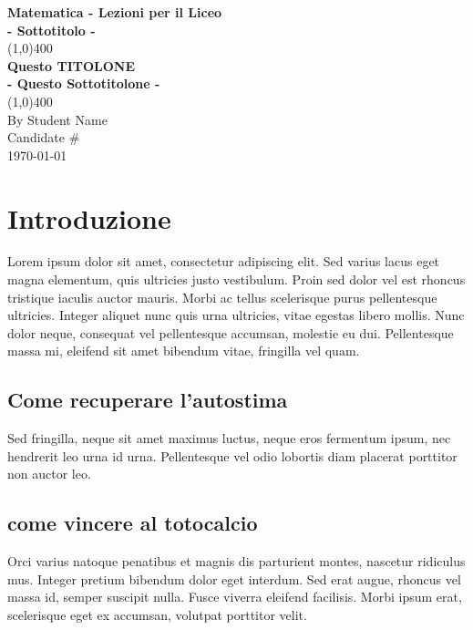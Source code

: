\documentclass[10pt]{article}
\begin{document}
\begin{titlepage}
\begin{center}
\vspace*{1cm}
\Large{\textbf{Matematica - Lezioni per il Liceo}}\\
\large{\textbf{- Sottotitolo -}}\\
\vfill
\line(1,0){400}\\[.5mm]
\huge{\textbf{Questo TITOLONE}}\\[3mm]
\Large{\textbf{- Questo Sottotitolone -}}\\[1mm]
\line(1,0){400}\\
\vfill
{\scriptsize By Student Name}\\
{\scriptsize Candidate \#} \\
{\scriptsize \today} \\

\end{center}
\end{titlepage}

\tableofcontents
\thispagestyle{empty}
\clearpage

\setcounter{page}{1}

\vspace*{1cm}
\section{Introduzione}
Lorem ipsum dolor sit amet, consectetur adipiscing elit. Sed varius lacus eget magna elementum, quis ultricies justo vestibulum. Proin sed dolor vel est rhoncus tristique iaculis auctor mauris. Morbi ac tellus scelerisque purus pellentesque ultricies. Integer aliquet nunc quis urna ultricies, vitae egestas libero mollis. Nunc dolor neque, consequat vel pellentesque accumsan, molestie eu dui. Pellentesque massa mi, eleifend sit amet bibendum vitae, fringilla vel quam.

\subsection{Come recuperare l'autostima}
Sed fringilla, neque sit amet maximus luctus, neque eros fermentum ipsum, nec hendrerit leo urna id urna. Pellentesque vel odio lobortis diam placerat porttitor non auctor leo. 



\subsection{come vincere al totocalcio}
Orci varius natoque penatibus et magnis dis parturient montes, nascetur ridiculus mus. Integer pretium bibendum dolor eget interdum. Sed erat augue, rhoncus vel massa id, semper suscipit nulla. Fusce viverra eleifend facilisis. Morbi ipsum erat, scelerisque eget ex accumsan, volutpat porttitor velit.\\
\end{document}
